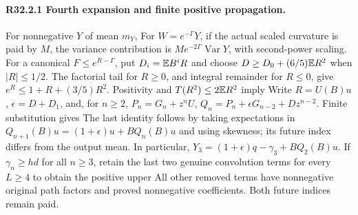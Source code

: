 \paragraph{R32.2.1 Fourth expansion and finite positive propagation.}
For nonnegative \(Y\) of mean \(m_Y\),
For \(W=e^{-\Gamma}Y\), if the actual scaled curvature is paid by \(M\),
the variance contribution is \(Me^{-2\Gamma}\operatorname{Var}Y\), with
second-power scaling. For a canonical \(F\le e^{R-\Gamma}\), put \(D_i=\mathbb E B^iR\) and choose
\(D\ge D_0+(6/5)\mathbb E R^2\) when \(|R|\le1/2\). The factorial tail for
\(R\ge0\), and integral remainder for \(R\le0\), give
\(e^R\le1+R+(3/5)R^2\). Positivity and \(T(R^2)\le2\mathbb E R^2\) imply
Write \(R=U(B)u\), \(\epsilon=D+D_1\), and, for \(n\ge2\),
\(P_n=G_n+z^nU\), \(Q_n=P_n+\epsilon G_{n-2}+Dz^{n-2}\).
Finite substitution gives
The last identity follows by taking expectations in
\(Q_{n+1}(B)u=(1+\epsilon)u+BQ_n(B)u\) and using skewness; its future
index differs from the output mean. In particular,
\(Y_3=(1+\epsilon)q-\gamma_3+BQ_2(B)u\).
If \(\gamma_n\ge hd\) for all \(n\ge3\), retain the last two genuine
convolution terms for every \(L\ge4\) to obtain the positive upper
All other removed terms have nonnegative original path factors and proved
nonnegative coefficients. Both future indices remain paid. 
